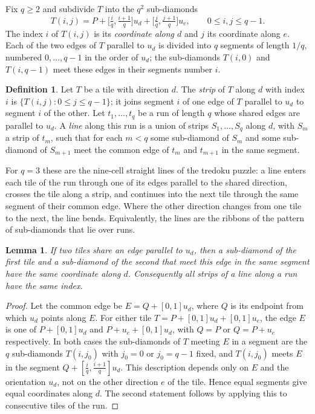 \documentclass[11pt,a4paper]{amsart}
\newtheorem{lemma}[theorem]{Lemma}
\theoremstyle{definition}
\newtheorem{definition}[theorem]{Definition}
\theoremstyle{remark}
\begin{document}
Fix $q\ge 2$ and subdivide $T$ into the $q^2$ sub-diamonds
\[
T(i,j)=P+\bigl[\tfrac{i}{q},\tfrac{i+1}{q}\bigr]u_d+\bigl[\tfrac{j}{q},\tfrac{j+1}{q}\bigr]u_e,\qquad 0\le i,j\le q-1 .
\]
The index $i$ of $T(i,j)$ is its \emph{coordinate along $d$} and $j$ its coordinate along $e$. Each of the two edges of $T$ parallel to $u_d$ is divided into $q$ segments of length $1/q$, numbered $0,\dots,q-1$ in the order of $u_d$; the sub-diamonds $T(i,0)$ and $T(i,q-1)$ meet these edges in their segments number $i$.

\begin{definition}\label{def:line}
Let $T$ be a tile with direction $d$. The \emph{strip} of $T$ along $d$ with index $i$ is $\{T(i,j):0\le j\le q-1\}$; it joins segment $i$ of one edge of $T$ parallel to $u_d$ to segment $i$ of the other. Let $t_1,\dots,t_q$ be a run of length $q$ whose shared edges are parallel to $u_d$. A \emph{line} along this run is a union of strips $S_1,\dots,S_q$ along $d$, with $S_m$ a strip of $t_m$, such that for each $m<q$ some sub-diamond of $S_m$ and some sub-diamond of $S_{m+1}$ meet the common edge of $t_m$ and $t_{m+1}$ in the same segment.
\end{definition}

For $q=3$ these are the nine-cell straight lines of the tredoku puzzle: a line enters each tile of the run through one of its edges parallel to the shared direction, crosses the tile along a strip, and continues into the next tile through the same segment of their common edge. Where the other direction changes from one tile to the next, the line bends. Equivalently, the lines are the ribbons of the pattern of sub-diamonds that lie over runs.

\begin{lemma}\label{lem:index}
If two tiles share an edge parallel to $u_d$, then a sub-diamond of the first tile and a sub-diamond of the second that meet this edge in the same segment have the same coordinate along $d$. Consequently all strips of a line along a run have the same index.
\end{lemma}

\begin{proof}
Let the common edge be $E=Q+[0,1]u_d$, where $Q$ is its endpoint from which $u_d$ points along $E$. For either tile $T=P+[0,1]u_d+[0,1]u_e$, the edge $E$ is one of $P+[0,1]u_d$ and $P+u_e+[0,1]u_d$, with $Q=P$ or $Q=P+u_e$ respectively. In both cases the sub-diamonds of $T$ meeting $E$ in a segment are the $q$ sub-diamonds $T(i,j_0)$ with $j_0=0$ or $j_0=q-1$ fixed, and $T(i,j_0)$ meets $E$ in the segment $Q+[\tfrac iq,\tfrac{i+1}{q}]u_d$. This description depends only on $E$ and the orientation $u_d$, not on the other direction $e$ of the tile. Hence equal segments give equal coordinates along $d$. The second statement follows by applying this to consecutive tiles of the run.
\end{proof}
\end{document}
